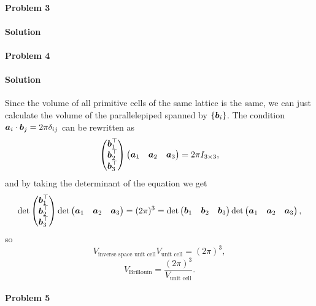 \documentclass[hyperref, a4paper]{article}
\begin{document}
\paragraph{Problem 3}

\paragraph{Solution} 

\paragraph{Problem 4}

\paragraph{Solution} Since the volume of all primitive cells of the same lattice is the same,
we can just calculate the volume of the parallelepiped spanned by $\{\vb*{b}_i\}$.
The condition $\vb*{a}_i \cdot \vb*{b}_j = 2\pi \delta_{ij}$ can be rewritten as 
\[
    \pmqty{ \vb*{b}_1^\top \\ \vb*{b}_2^\top \\ \vb*{b}_3^\top } \pmqty{ \vb*{a}_1 & \vb*{a}_2 & \vb*{a}_3 } = 2\pi I_{3 \times 3},
\]
and by taking the determinant of the equation we get 
\[
    \det \pmqty{ \vb*{b}_1^\top \\ \vb*{b}_2^\top \\ \vb*{b}_3^\top } \det \pmqty{ \vb*{a}_1 & \vb*{a}_2 & \vb*{a}_3 } = (2\pi)^3 = \det \pmqty{ \vb*{b}_1 & \vb*{b}_2 & \vb*{b}_3 } \det \pmqty{\vb*{a}_1 & \vb*{a}_2 & \vb*{a}_3},
\]
so 
\[
    V_{\text{inverse space unit cell}} V_{\text{unit cell}} = (2\pi)^3,
\]
\begin{equation}
    V_{\text{Brillouin}} = \frac{(2\pi)^3}{V_{\text{unit cell}}}.
\end{equation}

\paragraph{Problem 5} 
\end{document}
